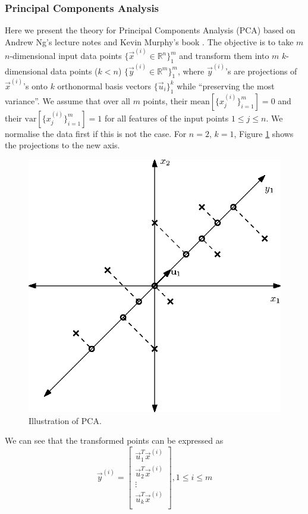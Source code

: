 	\subsubsection{Principal Components Analysis}
		Here we present the theory for Principal Components Analysis (PCA) based on Andrew Ng's lecture notes \cite{ng13} and Kevin Murphy's book \cite{mlBook}. The objective is to take $m$ $n$-dimensional input data points $\{\vec x^{(i)} \in \mathbb{R}^n\}_1^m$ and transform them into $m$ $k$-dimensional data points ($k<n$) $\{\vec y^{(i)} \in \mathbb{R}^m\}_1^m$, where $\vec y^{(i)}$'s are projections of $\vec x^{(i)}$'s onto $k$ orthonormal basis vectors $\{\vec u_i\}_1^k$ while ``preserving the most variance''. We assume that over all $m$ points, their $\text{mean}\left[\{x^{(i)}_j\}_{i = 1}^m\right] = 0$ and their $\text{var}\left[\{x^{(i)}_j\}_{i = 1}^m\right] = 1$ for all features of the input points $1 \leq j \leq n$. We normalise the data first if this is not the case. For $n = 2$, $k = 1$, Figure \ref{fig:pca} shows the projections to the new axis.
		\begin{figure}[ht]
			\centering
				\includegraphics{drawings/pca.eps}
			\caption{Illustration of PCA.}
			\label{fig:pca}
		\end{figure}

		We can see that the transformed points can be expressed as
		\begin{equation}
		 	\vec y^{(i)} =
		 		\begin{bmatrix}
		 			\vec u_1^T \vec x^{(i)} \\
		 			\vec u_2^T \vec x^{(i)} \\
		 			\vdots \\
		 			\vec u_k^T \vec x^{(i)} \\
		 		\end{bmatrix}
		 		, 1 \leq i \leq m
			\label{eqn:pca}
		\end{equation}
		
